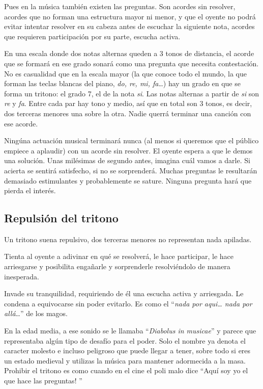 \documentclass[]{article}
\begin{document}
Pues en la música también existen las preguntas. Son acordes sin resolver, acordes que no forman una estructura mayor ni menor, y que el oyente no podrá evitar intentar resolver en su cabeza antes de escuchar la siguiente nota, acordes que requieren participación por su parte, escucha activa.

En una escala donde dos notas alternas queden a 3 tonos de distancia, el acorde que se formará en ese grado sonará como una pregunta que necesita contestación. No es casualidad que en la escala mayor (la que conoce todo el mundo, la que forman las teclas blancas del piano, \emph{do, re,   mi, fa}\ldots) hay un grado en que se forma un tritono: el grado 7, el de la nota \emph{si}. Las notas alternas a partir de \emph{si} son \emph{re} y \emph{fa}. Entre cada par hay tono y medio, así que en total son 3 tonos, es decir, dos terceras menores una sobre la otra. Nadie querrá terminar una canción con ese acorde.

Ningúna actuación musical terminará nunca (al menos si queremos que el público empiece a aplaudir) con un acorde sin resolver. El oyente espera a que le demos una solución. Unas milésimas de segundo antes, imagina cuál vamos a darle. Si acierta se sentirá satisfecho, si no se sorprenderá. Muchas preguntas le resultarán demasiado estimulantes y probablemente se sature. Ninguna pregunta hará que pierda el interés.

\subsection{Repulsión del tritono}

Un tritono suena repulsivo, dos terceras menores no representan nada apiladas.

Tienta al oyente a adivinar en qué se resolverá, le hace participar, le hace arriesgarse y posibilita engañarle y sorprenderle resolviéndolo de manera inesperada.

Invade su tranquilidad, requiriendo de él una escucha activa y arriesgada. Le condena a equivocarse sin poder evitarlo. Es como el ``\emph{nada por aqui\ldots{}   nada por allá}\ldots{}'' de los magos.

En la edad media, a ese sonido se le llamaba ``\emph{Diabolus in musicae}'' y parece que representaba algún tipo de desafío para el poder. Solo el nombre ya denota el caracter molesto e incluso peligroso que puede llegar a tener, sobre todo si eres un estado medieval y utilizas la música para mantener adormecida a la masa. Prohibir el tritono es como cuando en el cine el poli malo dice ``Aquí soy yo el que hace las preguntas! ''
\end{document}
